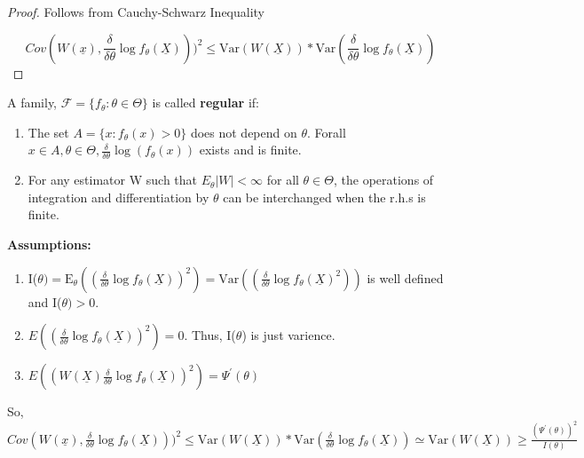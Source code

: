 \documentclass[11pt,fleqn]{book} %
\begin{document}
	\begin{proof}
		Follows from Cauchy-Schwarz Inequality 

		$$Cov(W(\underline{x}), \frac{\delta}{\delta\theta}\log f_\theta(\underline{X})))^2 \le \text{Var}(W(\underline{X}))*\text{Var}(\frac{\delta}{\delta\theta}\log f_\theta(\underline{X})) $$

	\end{proof}

	\begin{definition}[Regular]
		A family, $\mathcal{F} = \{f_\theta:\theta \in \Theta\}$ is called \textbf{regular} if:
		\begin{enumerate}[label = (\Roman*)]
			\item The set $A = \{x: f_\theta (x) > 0\}$ does not depend on $\theta$.  Forall $x\in A, \theta \in \Theta, \frac{\delta}{\delta\theta} \log(f_\theta(x))$ exists and is finite.
			\item For any estimator W such that $E_\theta|W| < \infty$ for all $\theta \in \Theta$, the operations of integration and differentiation by $\theta$ can be interchanged when the r.h.s is finite.
		\end{enumerate}
	\end{definition}

	\textbf{Assumptions:}
	\begin{enumerate}
		\item I($\theta)=\text{E}_\theta \left((\frac{\delta}{\delta \theta}\log f_\theta(\underline{X}))^2\right) = \text{Var}\left((\frac{\delta}{\delta \theta}\log f_\theta(\underline{X})^2)\right)$ is well defined and I($\theta)>0$.
		\item $E \left((\frac{\delta}{\delta \theta}\log f_\theta(\underline{X}))^2 \right)=0$. Thus, I($\theta$) is just varience.
		\item $E \left((W(\underline{X})\frac{\delta}{\delta \theta}\log f_\theta(\underline{X}))^2 \right)=\Psi^\prime(\theta)$
	\end{enumerate}

	So, \\
	$Cov(W(\underline{x}), \frac{\delta}{\delta\theta}\log f_\theta(\underline{X})))^2 \le \text{Var}(W(\underline{X}))*\text{Var}(\frac{\delta}{\delta\theta}\log f_\theta(\underline{X})) \simeq \text{Var}(W(\underline{X})) \ge \frac{(\Psi^\prime(\theta))^2}{I(\theta)}$
\end{document}
